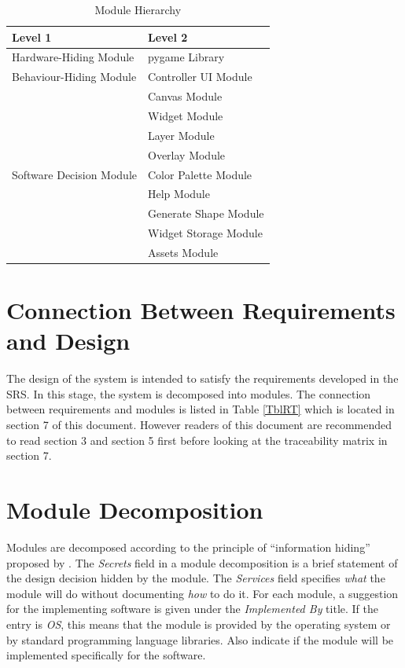 \documentclass[12pt, titlepage]{article}
\begin{document}
\begin{table}[h!]
\centering
\begin{tabular}{p{} p{}}
\toprule
\textbf{Level 1} & \textbf{Level 2}\\
\midrule

{Hardware-Hiding Module} & pygame Library \\
\midrule

\multirow{1}{0.3\textwidth}{Behaviour-Hiding Module} & Controller UI Module\\
\midrule

\multirow{9}{0.3\textwidth}{Software Decision Module} & Canvas Module\\
& Widget Module\\
& Layer Module\\
& Overlay Module\\
& Color Palette Module\\
& Help Module\\
& Generate Shape Module\\
& Widget Storage Module\\
& Assets Module\\
\bottomrule

\end{tabular}
\caption{Module Hierarchy}
\label{TblMH}
\end{table}

\newpage
\section{Connection Between Requirements and Design} \label{SecConnection}

The design of the system is intended to satisfy the requirements developed in
the SRS. In this stage, the system is decomposed into modules. The connection
between requirements and modules is listed in Table \ref{TblRT} which is located in section 7 of this document. However readers of this document are recommended to read section 3 and section 5 first before looking at the traceability matrix in section 7.

\section{Module Decomposition} \label{SecMD}

Modules are decomposed according to the principle of ``information hiding''
proposed by \citet{ParnasEtAl1984}. The \emph{Secrets} field in a module
decomposition is a brief statement of the design decision hidden by the
module. The \emph{Services} field specifies \emph{what} the module will do
without documenting \emph{how} to do it. For each module, a suggestion for the
implementing software is given under the \emph{Implemented By} title. If the
entry is \emph{OS}, this means that the module is provided by the operating
system or by standard programming language libraries.  Also indicate if the
module will be implemented specifically for the software.
\end{document}
